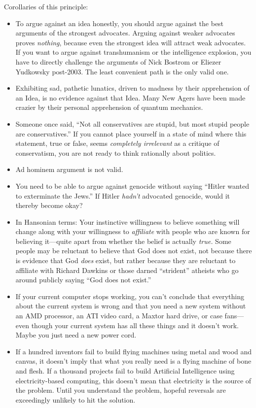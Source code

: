 {
 Corollaries of this principle:}

\begin{itemize}
  \item 
{
 To argue against an idea honestly, you should argue against the
best arguments of the strongest advocates. Arguing against weaker
advocates proves \textit{nothing}, because even the strongest idea will
attract weak advocates. If you want to argue against transhumanism or
the intelligence explosion, you have to directly challenge the
arguments of Nick Bostrom or Eliezer Yudkowsky post-2003. The least
convenient path is the only valid one.}

\item {
 Exhibiting sad, pathetic lunatics, driven to madness by their
apprehension of an Idea, is no evidence against that Idea. Many New
Agers have been made crazier by their personal apprehension of quantum
mechanics.}

\item {
 Someone once said, ``Not all conservatives are
stupid, but most stupid people are conservatives.''
If you cannot place yourself in a state of mind where this statement,
true or false, seems \textit{completely irrelevant} as a critique of
conservatism, you are not ready to think rationally about politics.}

\item {
 Ad hominem argument is not valid.}

\item {
 You need to be able to argue against genocide without saying
``Hitler wanted to exterminate the
Jews.'' If Hitler \textit{hadn't}
advocated genocide, would it thereby become okay?}

\item {
 In Hansonian terms: Your instinctive willingness to believe
something will change along with your willingness to \textit{affiliate}
with people who are known for believing it---quite apart from whether
the belief is actually \textit{true.} Some people may be reluctant to
believe that God does not exist, not because there is evidence that God
\textit{does} exist, but rather because they are reluctant to affiliate
with Richard Dawkins or those darned
``strident'' atheists who go around
publicly saying ``God does not
exist.''}


\item {
 If your current computer stops working, you can't
conclude that everything about the current system is wrong and that you
need a new system without an AMD processor, an ATI video card, a Maxtor
hard drive, or case fans---even though your current system has all
these things and it doesn't work. Maybe you just need a
new power cord.}

\item {
 If a hundred inventors fail to build flying machines using metal
and wood and canvas, it doesn't imply that what you
really need is a flying machine of bone and flesh. If a thousand
projects fail to build Artificial Intelligence using electricity-based
computing, this doesn't mean that electricity is the
source of the problem. Until you understand the problem, hopeful
reversals are exceedingly unlikely to hit the solution.}
\end{itemize}

